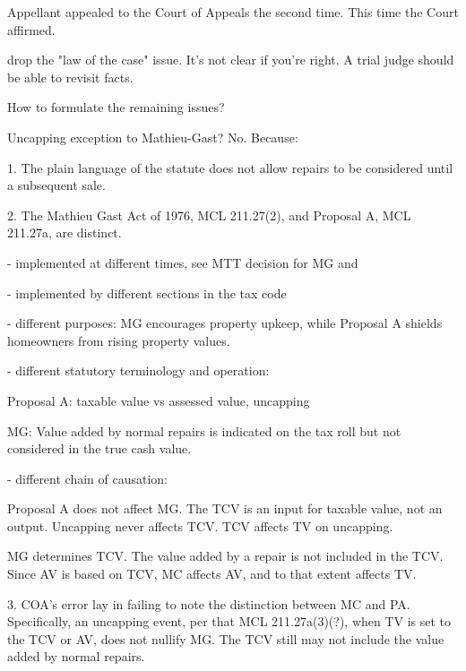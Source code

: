 \documentclass[12pt,\documentclassflag]{michiganCourtOfAppealsBrief}
\begin{document}
Appellant appealed to the Court of Appeals the second time. This time the Court affirmed.






drop the "law of the case" issue. It's not clear if you're right. A trial judge should be able to revisit facts. 

How to formulate the remaining issues?

Uncapping exception to Mathieu-Gast? No. Because:

1. The plain language of the statute does not allow repairs to be considered until a subsequent sale. 

2. The Mathieu Gast Act of 1976, MCL 211.27(2), and Proposal A, MCL 211.27a, are distinct.

- implemented at different times, see MTT decision for MG and
\href{https://scholar.google.com/scholar_case?case=72557110551027365&q=%22mcl+211.27a%22+%22proposal+a%22&hl=en&as_sdt=4,55,199}{\cite{Klooster}}

  \href{https://scholar.google.com/scholar_case?case=72557110551027365\&q=\%22mcl+211.27a\%22+\%22proposal+a\%22&hl=en&as_sdt=4,55,199}{\protect\cite{Klooster}}

  \cite{Klooster}

  - implemented by different sections in the tax code

  - different purposes: MG encourages property upkeep, while Proposal A shields homeowners from rising property values. 

  - different statutory terminology and operation: 

  Proposal A: taxable value vs assessed value, uncapping

  MG: Value added by normal repairs is indicated on the tax roll but not considered in the true cash value. 

  - different chain of causation:

  Proposal A does not affect MG. The TCV is an input for taxable value, not an output. Uncapping never affects TCV. TCV affects TV on uncapping.

  MG determines TCV. The value added by a repair is not included in the TCV. Since AV is based on TCV, MC affects AV, and to that extent affects TV. 

  3. COA's error lay in failing to note the distinction between MC and PA. Specifically, an uncapping event, per that MCL 211.27a(3)(?), when TV is set to the TCV or AV, does not nullify MG. The TCV still may not include the value added by normal repairs.
\end{document}
